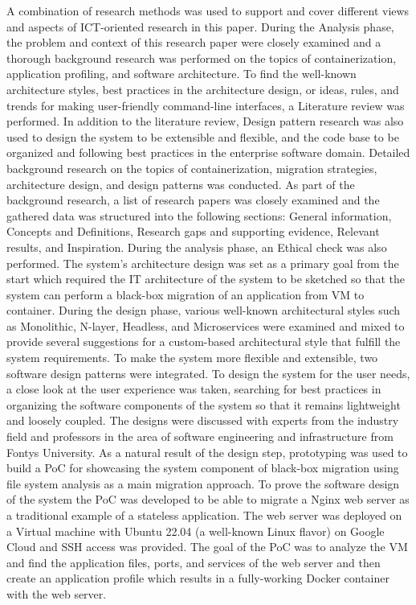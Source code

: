 \documentclass{article}
\begin{document}
\begin{multicols}{2}
A combination of research methods was used to support and cover different views and aspects of ICT-oriented research in this paper. During the Analysis phase, the problem and context of this research paper were closely examined and a thorough background research was performed on the topics of containerization, application profiling, and software architecture. To find the well-known architecture styles, best practices in the architecture design, or ideas, rules, and trends for making user-friendly command-line interfaces, a Literature review was performed. In addition to the literature review, Design pattern research was also used to design the system to be extensible and flexible, and the code base to be organized and following best practices in the enterprise software domain. Detailed background research on the topics of containerization, migration strategies, architecture design, and design patterns was conducted. As part of the background research, a list of research papers was closely examined and the gathered data was structured into the following sections: General information, Concepts and Definitions, Research gaps and supporting evidence, Relevant results, and Inspiration. During the analysis phase, an Ethical check was also performed.
The system's architecture design was set as a primary goal from the start which required the IT architecture of the system to be sketched so that the system can perform a black-box migration of an application from VM to container. During the design phase, various well-known architectural styles such as Monolithic, N-layer, Headless, and Microservices were examined and mixed to provide several suggestions for a custom-based architectural style that fulfill the system requirements. To make the system more flexible and extensible, two software design patterns were integrated. To design the system for the user needs, a close look at the user experience was taken, searching for best practices in organizing the software components of the system so that it remains lightweight and loosely coupled. The designs were discussed with experts from the industry field and professors in the area of software engineering and infrastructure from Fontys University.
As a natural result of the design step, prototyping was used to build a PoC for showcasing the system component of black-box migration using file system analysis as a main migration approach. To prove the software design of the system the PoC was developed to be able to migrate a Nginx web server as a traditional example of a stateless application. The web server was deployed on a Virtual machine with Ubuntu 22.04 (a well-known Linux flavor) on Google Cloud and SSH access was provided. The goal of the PoC was to analyze the VM and find the application files, ports, and services of the web server and then create an application profile which results in a fully-working Docker container with the web server.

\end{multicols}
\end{document}
